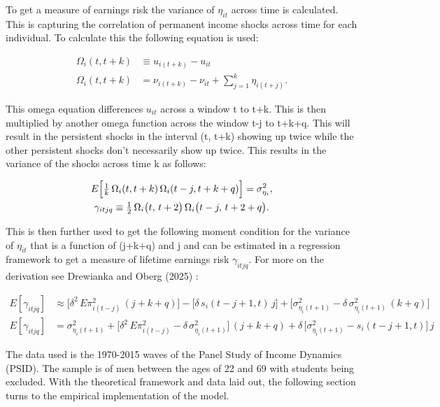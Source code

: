\documentclass[12pt]{article}
\begin{document}
\begin{onehalfspace}
To get a measure of earnings risk the variance of $\eta_{it}$ across time is calculated. This is capturing the correlation of permanent income shocks across time for each individual. To calculate this the following equation is used:

\begin{align}
\Omega_i(t,t+k)
&\equiv u_{i(t+k)} - u_{it}\\[1ex]
\Omega_i(t,t+k)
&= \nu_{i(t+k)} - \nu_{it}
  + \sum_{j=1}^k \eta_{i(t+j)}.
\end{align}

This omega equation differences $u_{it}$ across a window t to t+k. This is then multiplied by another omega function across the window t-j to t+k+q. This will result in the persistent shocks in the interval (t, t+k) showing up twice while the other persistent shocks don't necessarily show up twice. This results in the variance of the shocks across time k as follows:

\begin{gather}
E\Bigl[\tfrac{1}{k}\,\Omega_i(t,t+k)\,\Omega_i(t-j,t+k+q)\Bigr]
= \sigma^2_{\eta_i},\\
\gamma_{itjq}
\equiv \tfrac12\,\Omega_i\bigl(t,\,t+2\bigr)\,\Omega_i\bigl(t - j,\,t + 2 + q\bigr).
\end{gather}

This is then further used to get the following moment condition for the variance of $\eta_{it}$ that is a function of (j+k+q) and j and can be estimated in a regression framework to get a measure of lifetime earnings risk $\gamma_{itjq}$. For more on the derivation see Drewianka and Oberg (2025) \cite{drewianka2025}:

\begin{align}
E[\gamma_{itjq}]
&\approx
\bigl[\delta^2\,E\pi^2_{i(t-j)}\,(j+k+q)\bigr]
- \bigl[\delta\,s_i(t-j+1,t)\,j\bigr]
+ \bigl[\sigma^2_{\eta_i(t+1)}
  - \delta\,\sigma^2_{\eta_i(t+1)}\,(k+q)\bigr] \\[1ex]
E[\gamma_{itjq}]
&=
\sigma^2_{\eta_i(t+1)}
+ \bigl[\delta^2\,E\pi^2_{i(t-j)} - \delta\,\sigma^2_{\eta_i(t+1)}\bigr]\,(j+k+q)
+ \delta\,\bigl[\sigma^2_{\eta_i(t+1)} - s_i(t-j+1,t)\bigr]\,j
\end{align}

The data used is the 1970-2015 waves of the Panel Study of Income Dynamics (PSID). The sample is of men between the ages of 22 and 69 with students being excluded. With the theoretical framework and data laid out, the following section turns to the empirical implementation of the model.


\end{onehalfspace}
\end{document}
